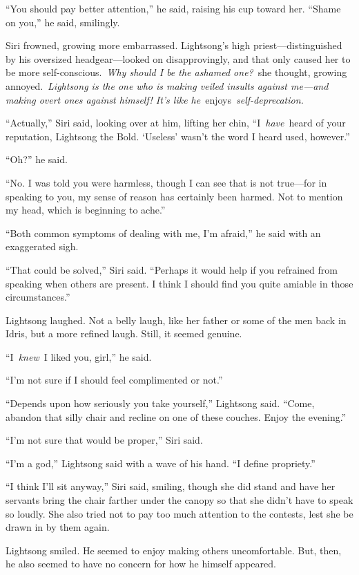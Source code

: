 “You should pay better attention,” he said, raising his cup toward her. “Shame on you,” he said, smilingly.

Siri frowned, growing more embarrassed. Lightsong’s high priest—distinguished by his oversized headgear—looked on disapprovingly, and that only caused her to be more self-conscious.~\textit{Why should I be the ashamed one?}~she thought, growing annoyed.~\textit{Lightsong is the one who is making veiled insults against me—and making overt ones against himself! It’s like he}~enjoys~\textit{self-deprecation.}

“Actually,” Siri said, looking over at him, lifting her chin, “I~\textit{have}~heard of your reputation, Lightsong the Bold. ‘Useless’ wasn’t the word I heard used, however.”

“Oh?” he said.

“No. I was told you were harmless, though I can see that is not true—for in speaking to you, my sense of reason has certainly been harmed. Not to mention my head, which is beginning to ache.”

“Both common symptoms of dealing with me, I’m afraid,” he said with an exaggerated sigh.

“That could be solved,” Siri said. “Perhaps it would help if you refrained from speaking when others are present. I think I should find you quite amiable in those circumstances.”

Lightsong laughed. Not a belly laugh, like her father or some of the men back in Idris, but a more refined laugh. Still, it seemed genuine.

“I~\textit{knew}~I liked you, girl,” he said.

“I’m not sure if I should feel complimented or not.”

“Depends upon how seriously you take yourself,” Lightsong said. “Come, abandon that silly chair and recline on one of these couches. Enjoy the evening.”

“I’m not sure that would be proper,” Siri said.

“I’m a god,” Lightsong said with a wave of his hand. “I define propriety.”

“I think I’ll sit anyway,” Siri said, smiling, though she did stand and have her servants bring the chair farther under the canopy so that she didn’t have to speak so loudly. She also tried not to pay too much attention to the contests, lest she be drawn in by them again.

Lightsong smiled. He seemed to enjoy making others uncomfortable. But, then, he also seemed to have no concern for how he himself appeared.

